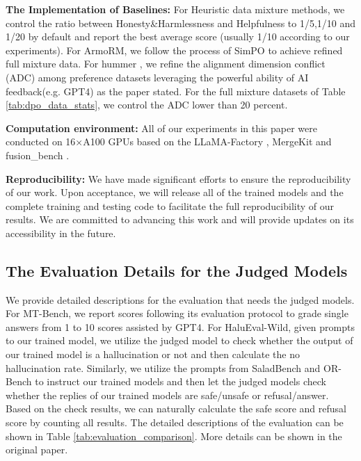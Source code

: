 \textbf{The Implementation of Baselines:} For Heuristic data mixture methods, we control the ratio between Honesty\&Harmlessness and Helpfulness to 1/5,1/10 and 1/20 by default and report the best average score (usually 1/10 according to our experiments). For ArmoRM, we follow the process of SimPO \cite{meng2024simpo} to achieve refined full mixture data. For hummer \cite{jiang2024hummer}, we refine the alignment dimension conflict (ADC) among preference datasets leveraging the powerful ability of AI feedback(e.g. GPT4) as the paper stated. For the full mixture datasets of Table \ref{tab:dpo_data_stats}, we control the ADC lower than 20 percent.




\textbf{Computation environment:} All of our experiments in this paper were conducted on 16×A100 GPUs based on the LLaMA-Factory \cite{zheng2024llamafactory}, MergeKit \cite{goddard2024arcee} and fusion\_bench \cite{tang2024fusionbench}.


\textbf{Reproducibility:} We have made significant efforts to ensure the reproducibility of our work. Upon acceptance, we will release all of the trained models and the complete training and testing code to facilitate the full reproducibility of our results. We are committed to advancing this work and will provide updates on its accessibility in the future. 



\subsection{The Evaluation Details for the Judged Models}\label{evaluation_datails}
We provide detailed descriptions for the evaluation that needs the judged models. For MT-Bench, we report scores following its evaluation
protocol to grade single answers from 1 to 10 scores assisted by GPT4. For HaluEval-Wild, given prompts to our trained model, we utilize the judged model to check whether the output of our trained model is a hallucination or not and then calculate the no hallucination rate. Similarly, we utilize the prompts from SaladBench and OR-Bench to instruct our trained models and then let the judged models check whether the replies of our trained models are safe/unsafe or refusal/answer. Based on the check results, we can naturally calculate the safe score and refusal score by counting all results. The detailed descriptions of the evaluation can be shown in Table \ref{tab:evaluation_comparison}.  More details can be shown in the original paper.

